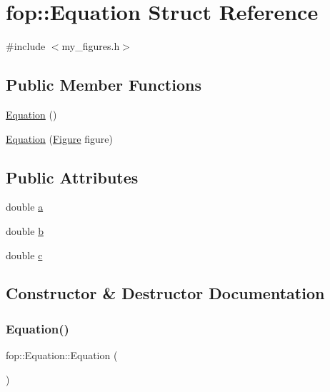 \hypertarget{structfop_1_1_equation}{}\section{fop\+:\+:Equation Struct Reference}
\label{structfop_1_1_equation}


{\ttfamily \#include $<$my\+\_\+figures.\+h$>$}

\subsection*{Public Member Functions}
\begin{DoxyCompactItemize}
\item 
\mbox{\hyperlink{structfop_1_1_equation_a6cd4c227e9b83e949c4c2568854512a3}{Equation}} ()
\item 
\mbox{\hyperlink{structfop_1_1_equation_a93886a166390114aa62609af6ddd1d72}{Equation}} (\mbox{\hyperlink{classfop_1_1_figure}{Figure}} figure)
\end{DoxyCompactItemize}
\subsection*{Public Attributes}
\begin{DoxyCompactItemize}
\item 
double \mbox{\hyperlink{structfop_1_1_equation_a9cc4610dcc3a68de1def70a8573cf75f}{a}}
\item 
double \mbox{\hyperlink{structfop_1_1_equation_a6bf704c5c87c9a321c18869f634a5ff1}{b}}
\item 
double \mbox{\hyperlink{structfop_1_1_equation_a795ea1202f12b407544c305d79e39872}{c}}
\end{DoxyCompactItemize}


\subsection{Constructor \& Destructor Documentation}
\mbox{\label{structfop_1_1_equation_a6cd4c227e9b83e949c4c2568854512a3}} 
\subsubsection{\texorpdfstring{Equation()}{Equation()}\hspace{0.1cm}{\footnotesize\ttfamily [1/2]}}
{\footnotesize\ttfamily fop\+::\+Equation\+::\+Equation (\begin{DoxyParamCaption}{ }\end{DoxyParamCaption})}

